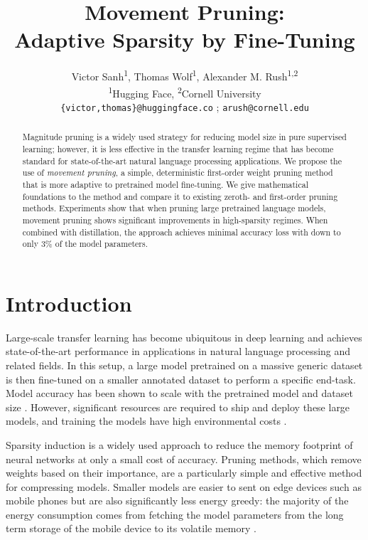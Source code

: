 \documentclass{article}
\title{Movement Pruning: \\ Adaptive Sparsity by Fine-Tuning}
\author{
  Victor Sanh\textsuperscript{1}, Thomas Wolf\textsuperscript{1}, Alexander M. Rush\textsuperscript{1,2}\\
  \textsuperscript{1}Hugging Face, \textsuperscript{2}Cornell University\\
  \texttt{\{victor,thomas\}@huggingface.co} ; \texttt{arush@cornell.edu}
}
\begin{document}
\maketitle

\begin{abstract}
    Magnitude pruning is a widely used strategy for reducing model size in pure supervised learning; however, it is less effective in the transfer learning regime that has become standard for state-of-the-art natural language processing applications. We propose the use of \textit{movement pruning}, a simple, deterministic first-order weight pruning method that is more adaptive to pretrained model fine-tuning. We give mathematical foundations to the method and compare it to existing zeroth- and first-order pruning methods. Experiments show that when pruning large pretrained language models, movement pruning shows significant improvements in high-sparsity regimes. When combined with distillation, the approach achieves minimal accuracy loss with down to only 3\% of the model parameters.
\end{abstract}



\section{Introduction}

Large-scale transfer learning has become ubiquitous in deep learning and achieves state-of-the-art performance in applications in natural language processing and related fields. In this setup, a large model pretrained on a massive generic dataset is then fine-tuned on a smaller annotated dataset to perform a specific end-task. Model accuracy has been shown to scale with the pretrained model and dataset size \citep{Raffel2019ExploringTL}. However, significant resources are required to ship and deploy these large models, and training the models have high environmental costs \citep{Strubell2019EnergyAP}. 

Sparsity induction is a widely used approach to reduce the memory footprint of neural networks at only a small cost of accuracy. Pruning methods, which remove weights based on their importance, are a particularly simple and effective method for compressing models. Smaller models are easier to sent on edge devices such as mobile phones but are also significantly less energy greedy: the majority of the energy consumption comes from fetching the model parameters from the long term storage of the mobile device to its volatile memory \citep{Han2016EIEEI,6757323}.
\end{document}
